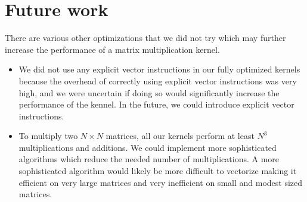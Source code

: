\section{Future work}\label{sec:future}
There are various other optimizations that we did not try which may further
increase the performance of a matrix multiplication kernel.

\begin{itemize}
  \item
    We did not use any explicit vector instructions in our fully optimized
    kernels because the overhead of correctly using explicit vector
    instructions was very high, and we were uncertain if doing so would
    significantly increase the performance of the kennel. In the future, we
    could introduce explicit vector instructions.

  \item
    To multiply two $N \times N$ matrices, all our kernels perform at least
    $N^3$ multiplications and additions. We could implement more sophisticated
    algorithms which reduce the needed number of multiplications. A more
    sophisticated algorithm would likely be more difficult to vectorize making
    it efficient on very large matrices and very inefficient on small and
    modest sized matrices.
\end{itemize}
